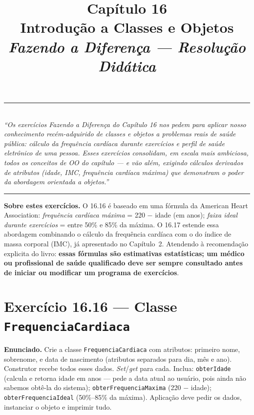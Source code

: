 \documentclass[11pt,a4paper]{article}
\title{
  \vspace{-1cm}
  {\Huge\bfseries\color{deitelblue} Cap\'itulo 16}\\[0.3em]
  {\Large\bfseries Introdu\c{c}\~ao a Classes e Objetos}\\[0.8em]
  {\large\itshape Fazendo a Diferen\c{c}a --- Resolu\c{c}\~ao Did\'atica}
}
\author{}
\date{}
\begin{document}
\maketitle
\thispagestyle{empty}
\vspace{-2em}

\begin{center}
\rule{0.85\textwidth}{0.5pt}\\[0.4em]
\textit{``Os exerc\'icios \emph{Fazendo a Diferen\c{c}a} do Cap\'itulo 16 nos pedem para aplicar nosso conhecimento rec\'em-adquirido de classes e objetos a problemas reais de sa\'ude p\'ublica: c\'alculo da frequ\^encia card\'iaca durante exerc\'icios e perfil de sa\'ude eletr\^onico de uma pessoa. Esses exerc\'icios consolidam, em escala mais ambiciosa, todos os conceitos de OO do cap\'itulo --- e v\~ao al\'em, exigindo c\'alculos derivados de atributos (idade, IMC, frequ\^encia card\'iaca m\'axima) que demonstram o poder da abordagem orientada a objetos.''}\\[0.4em]
\rule{0.85\textwidth}{0.5pt}
\end{center}

\vspace{1em}

\begin{diferencabox}
\textbf{Sobre estes exerc\'icios.} O 16.16 \'e baseado em uma f\'ormula da American Heart Association: \emph{frequ\^encia card\'iaca m\'axima} = 220 $-$ idade (em anos); \emph{faixa ideal durante exerc\'icios} = entre 50\% e 85\% da m\'axima. O 16.17 estende essa abordagem combinando o c\'alculo da frequ\^encia card\'iaca com o do \'indice de massa corporal (IMC), j\'a apresentado no Cap\'itulo~2. Atendendo \`a recomenda\c{c}\~ao explicita do livro: \textbf{essas f\'ormulas s\~ao estimativas estat\'isticas; um m\'edico ou profissional de sa\'ude qualificado deve ser sempre consultado antes de iniciar ou modificar um programa de exerc\'icios}.
\end{diferencabox}

\section{Exerc\'icio 16.16 --- Classe \texttt{FrequenciaCardiaca}}

\begin{enunciado}
\textbf{Enunciado.} Crie a classe \texttt{FrequenciaCardiaca} com atributos: primeiro nome, sobrenome, e data de nascimento (atributos separados para dia, m\^es e ano). Construtor recebe todos esses dados. \emph{Set}/\emph{get} para cada. Inclua: \texttt{obterIdade} (calcula e retorna idade em anos --- pede a data atual ao usu\'ario, pois ainda n\~ao sabemos obt\^e-la do sistema); \texttt{obterFrequenciaMaxima} (220 $-$ idade); \texttt{obterFrequenciaIdeal} (50\%--85\% da m\'axima). Aplica\c{c}\~ao deve pedir os dados, instanciar o objeto e imprimir tudo.
\end{enunciado}
\end{document}
